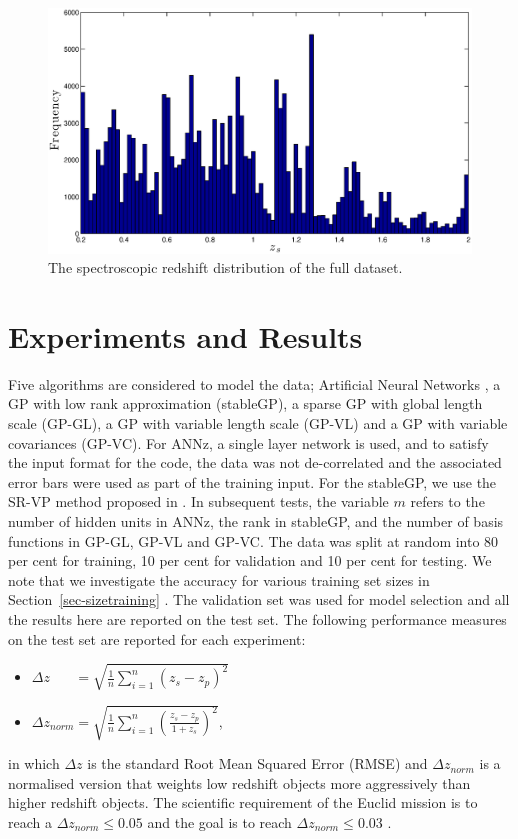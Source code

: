 \documentclass[useAMS,usenatbib,fleqn]{mn2e}
\begin{document}
\begin{figure}
       \centering
       \includegraphics[width=\columnwidth]{figures/zspec.eps}
        \caption{The spectroscopic redshift distribution of the full dataset.}
       \label{fig-zspec-hostogram}
\end{figure}

\section{Experiments and Results}
\label{sec-experiments}

Five algorithms are considered to model the data; Artificial Neural Networks \citep[ANNz;][]{Collister04}, a GP with low rank approximation (stableGP), a sparse GP with global length scale (GP-GL), a GP with variable length scale (GP-VL) and a GP with variable covariances (GP-VC). For ANNz, a single layer network is used, and to satisfy the input format for the code, the data was not de-correlated and the associated error bars were used as part of the training input. For the stableGP, we use the SR-VP method proposed in \citep{foster2009}. In subsequent tests, the variable $m$ refers to the number of hidden units in ANNz, the rank in stableGP, and the number of basis functions in GP-GL, GP-VL and GP-VC. The data was split at random into 80 per cent for training, 10 per cent for validation and 10 per cent for testing. We note that we investigate the accuracy for various training set sizes in Section~\ref{sec-sizetraining} . The validation set was used for model selection and all the results here are reported on the test set. The following performance measures on the test set are reported for each experiment:
\begin{itemize}
  \item $\Delta z_{\phantom{norm}} = \sqrt{\frac{1}{n}\sum_{i=1}^{n}\left(z_{s}-z_{p}\right)^{2}}$
  \item $\Delta z_{norm} = \sqrt{\frac{1}{n}\sum_{i=1}^{n}\left(\frac{z_{s}-z_{p}}{1+z_{s}}\right)^{2}}$,
\end{itemize}
in which $\Delta z$ is the standard Root Mean Squared Error (RMSE) and $\Delta z_{norm}$ is a normalised version that weights low redshift objects more aggressively than higher redshift objects. The scientific requirement of the Euclid mission is to reach a $\Delta z_{norm} \le 0.05$ and the goal is to reach $\Delta z_{norm} \le 0.03$ \citep{laureijs2011}.
\end{document}
